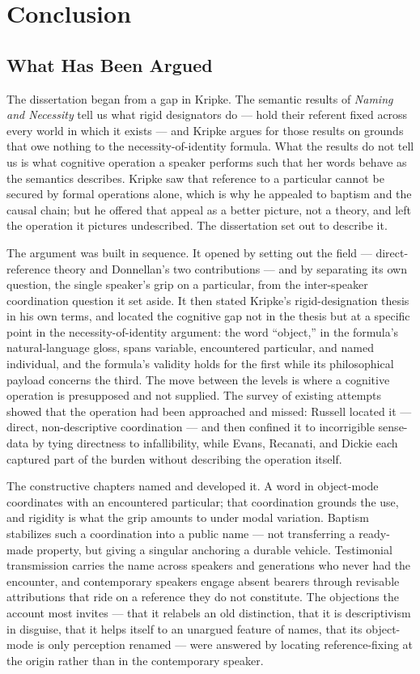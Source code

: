 \documentclass[12pt,a4paper]{article}
\begin{document}
\section{Conclusion}\label{conclusion}

\subsection{What Has Been Argued}\label{what-has-been-argued}

The dissertation began from a gap in Kripke. The semantic results of \emph{Naming and Necessity} tell us what rigid designators do --- hold their referent fixed across every world in which it exists --- and Kripke argues for those results on grounds that owe nothing to the necessity-of-identity formula. What the results do not tell us is what cognitive operation a speaker performs such that her words behave as the semantics describes. Kripke saw that reference to a particular cannot be secured by formal operations alone, which is why he appealed to baptism and the causal chain; but he offered that appeal as a better picture, not a theory, and left the operation it pictures undescribed. The dissertation set out to describe it.

The argument was built in sequence. It opened by setting out the field --- direct-reference theory and Donnellan's two contributions --- and by separating its own question, the single speaker's grip on a particular, from the inter-speaker coordination question it set aside. It then stated Kripke's rigid-designation thesis in his own terms, and located the cognitive gap not in the thesis but at a specific point in the necessity-of-identity argument: the word ``object,'' in the formula's natural-language gloss, spans variable, encountered particular, and named individual, and the formula's validity holds for the first while its philosophical payload concerns the third. The move between the levels is where a cognitive operation is presupposed and not supplied. The survey of existing attempts showed that the operation had been approached and missed: Russell located it --- direct, non-descriptive coordination --- and then confined it to incorrigible sense-data by tying directness to infallibility, while Evans, Recanati, and Dickie each captured part of the burden without describing the operation itself.

The constructive chapters named and developed it. A word in object-mode coordinates with an encountered particular; that coordination grounds the use, and rigidity is what the grip amounts to under modal variation. Baptism stabilizes such a coordination into a public name --- not transferring a ready-made property, but giving a singular anchoring a durable vehicle. Testimonial transmission carries the name across speakers and generations who never had the encounter, and contemporary speakers engage absent bearers through revisable attributions that ride on a reference they do not constitute. The objections the account most invites --- that it relabels an old distinction, that it is descriptivism in disguise, that it helps itself to an unargued feature of names, that its object-mode is only perception renamed --- were answered by locating reference-fixing at the origin rather than in the contemporary speaker.
\end{document}
